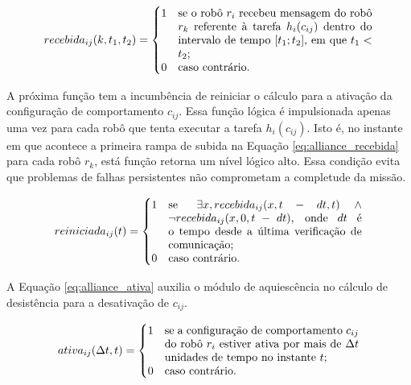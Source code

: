         \begin{equation} \label{eq:alliance_recebida}
            recebida_{ij}(k, t_1, t_2) =
            \begin{cases}
                1 & \parbox[t]{.5\textwidth}{se o robô $r_i$ recebeu mensagem do robô $r_k$ referente à tarefa $h_i(c_{ij})$ dentro do intervalo de tempo $[t_1; t_2]$, em que $t_1 < t_2$;} \\
                0 & \text{caso contrário.}
            \end{cases}
        \end{equation}
        
        A próxima função tem a incumbência de reiniciar o cálculo para a ativação da configuração de comportamento $c_{ij}$. Essa função lógica é impulsionada apenas uma vez para cada robô que tenta executar a tarefa $h_i(c_{ij})$. Isto é, no instante em que acontece a primeira rampa de subida na Equação \ref{eq:alliance_recebida} para cada robô $r_k$, está função retorna um nível lógico alto. Essa condição evita que problemas de falhas persistentes não comprometam a completude da missão.
         
        \begin{equation} \label{eq:alliance_reiniciada}
            reiniciada_{ij}(t) =
            \begin{cases}
                1 & \parbox[t]{.5\textwidth}{se $\exists x, recebida_{ij}(x, t - dt, t) \,\land\, \lnot recebida_{ij}(x, 0, t - dt)$, onde $dt$ é o tempo desde a última verificação de comunicação;} \\
                0 & \text{caso contrário.}
            \end{cases}
        \end{equation}
        
        A Equação \ref{eq:alliance_ativa} auxilia o módulo de aquiescência no cálculo de desistência para a desativação de $c_{ij}$.
        
        \begin{equation} \label{eq:alliance_ativa}
            ativa_{ij}(\Delta t, t) =
            \begin{cases}
                1 & \parbox[t]{.5\textwidth}{se a configuração de comportamento $c_{ij}$ do robô $r_i$ estiver ativa por mais de $\Delta t$ unidades de tempo no instante $t$;} \\
                0 & \text{caso contrário.}
            \end{cases}
        \end{equation}
        
